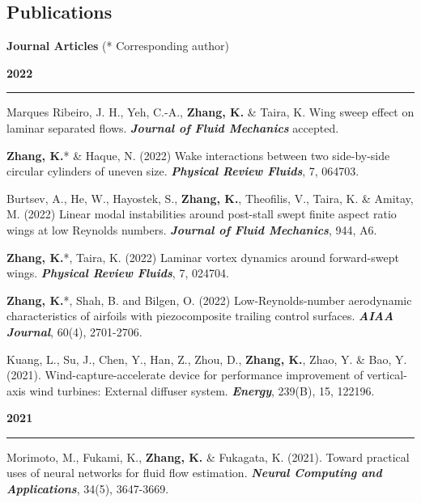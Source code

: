 \documentclass[10pt]{article}
\begin{document}
\subsection*{Publications}
{\bf \color{Blue}Journal Articles} (*  Corresponding author)
{\small
\begin{etaremune}

 
 \item [] {\bf \color{Blue} 2022 \rule{14.8cm}{0.2mm}}
 
 \item Marques Ribeiro, J. H., Yeh, C.-A., \textbf{Zhang, K.} \& Taira, K. Wing sweep effect on laminar separated flows.  \textit{\textbf{Journal of Fluid Mechanics}} accepted. 

 \item \textbf{Zhang, K.}* \& Haque, N. (2022) Wake interactions between two side-by-side circular cylinders of uneven size.  \textit{\textbf{Physical Review Fluids}}, 7, 064703.

  \item Burtsev, A., He, W., Hayostek, S., \textbf{Zhang, K.}, Theofilis, V., Taira, K. \& Amitay, M. (2022) Linear modal instabilities around post-stall swept finite aspect ratio wings at low Reynolds numbers. \textit{\textbf{Journal of Fluid Mechanics}}, 944, A6.

  \item \textbf{Zhang, K.}*, Taira, K. (2022) Laminar vortex dynamics around forward-swept wings.  \textit{\textbf{Physical Review Fluids}}, 7, 024704.

  \item \textbf{Zhang, K.}*, Shah, B. and Bilgen, O. (2022) Low-Reynolds-number aerodynamic characteristics of airfoils with piezocomposite trailing control surfaces. \textit{\textbf{AIAA Journal}}, 60(4), 2701-2706.

	\item Kuang, L., Su, J., Chen, Y., Han, Z., Zhou, D., \textbf{Zhang, K.}, Zhao, Y. \& Bao, Y. (2021). Wind-capture-accelerate device for performance improvement of vertical-axis wind turbines: External diffuser system. \textit{\textbf{Energy}}, 239(B), 15, 122196. 

\item [] {\bf \color{Blue} 2021 \rule{14.8cm}{0.2mm}}

  \item Morimoto, M., Fukami, K., \textbf{Zhang, K.} \& Fukagata, K. (2021). Toward practical uses of neural networks for fluid flow estimation. \textit{\textbf{Neural Computing and Applications}}, 34(5), 3647-3669.


\end{etaremune}}
\end{document}
